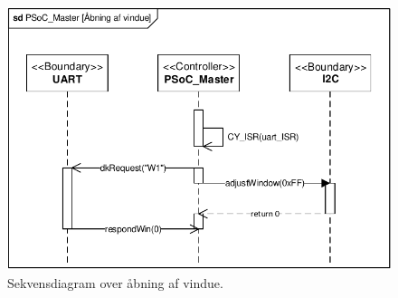 \begin{figure}[h]
\centering
\includegraphics[scale=1]{../fig/sd_PSoC_master_open_window}
\caption{Sekvensdiagram over åbning af vindue.}
\label{fig:sd_PSoC_master_window}
\end{figure}



\clearpage